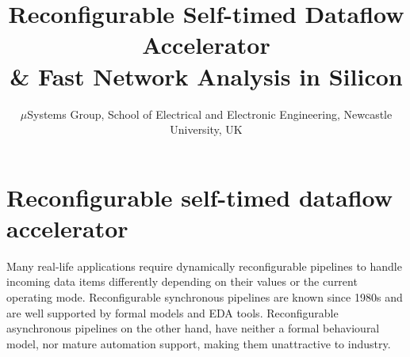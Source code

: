 \documentclass[conference]{IEEEtran}
\begin{document}
\title{Reconfigurable Self-timed Dataflow Accelerator \\\& Fast Network Analysis in Silicon}

\author{$\mu$Systems Group, School of Electrical and Electronic Engineering, Newcastle University, UK}

\maketitle

\IEEEpeerreviewmaketitle


\section*{Reconfigurable self-timed dataflow accelerator}
Many real-life applications require dynamically
reconfigurable pipelines to handle incoming data items differently depending on their values
or the current operating mode. Reconfigurable synchronous
pipelines are known since 1980s and are well
supported by formal models and EDA tools. Reconfigurable asynchronous
pipelines on the other hand, have neither a formal behavioural model, nor
mature automation support, making them unattractive to industry.
\end{document}
